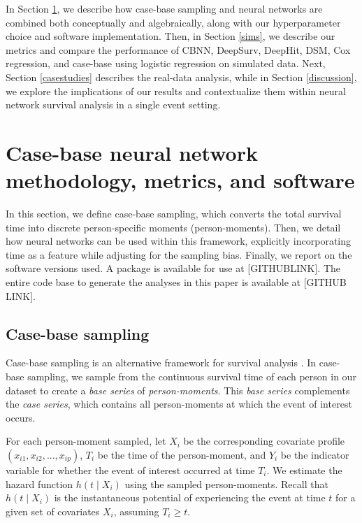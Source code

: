 \documentclass[AMA,STIX1COL,]{WileyNJD-v2}
\begin{document}
In Section \ref{methods}, we describe how case-base sampling and neural
networks are combined both conceptually and algebraically, along with
our hyperparameter choice and software implementation. Then, in Section
\ref{sims}, we describe our metrics and compare the performance of CBNN,
DeepSurv, DeepHit, DSM, Cox regression, and case-base using logistic
regression on simulated data. Next, Section \ref{casestudies} describes
the real-data analysis, while in Section \ref{discussion}, we explore
the implications of our results and contextualize them within neural
network survival analysis in a single event setting.

\hypertarget{methods}{%
\section{Case-base neural network methodology, metrics, and
software}\label{methods}}

In this section, we define case-base sampling, which converts the total
survival time into discrete person-specific moments (person-moments).
Then, we detail how neural networks can be used within this framework,
explicitly incorporating time as a feature while adjusting for the
sampling bias. Finally, we report on the software versions used. A
package is available for use at {[}GITHUBLINK{]}. The entire code base
to generate the analyses in this paper is available at {[}GITHUB
LINK{]}.

\hypertarget{case-base-sampling}{%
\subsection{Case-base sampling}\label{case-base-sampling}}

Case-base sampling is an alternative framework for survival analysis
\citep{hanley2009}. In case-base sampling, we sample from the continuous
survival time of each person in our dataset to create a \emph{base
series} of \emph{person-moments}. This \emph{base series} complements
the \emph{case series}, which contains all person-moments at which the
event of interest occurs.

For each person-moment sampled, let \(X_i\) be the corresponding
covariate profile \(\left(x_{i1},x_{i2},...,x_{ip} \right)\), \(T_i\) be
the time of the person-moment, and \(Y_i\) be the indicator variable for
whether the event of interest occurred at time \(T_i\). We estimate the
hazard function \(h(t \mid X_i)\) using the sampled person-moments.
Recall that \(h(t \mid X_i)\) is the instantaneous potential of
experiencing the event at time \(t\) for a given set of covariates
\(X_i\), assuming \(T_i \geq t\).
\end{document}
